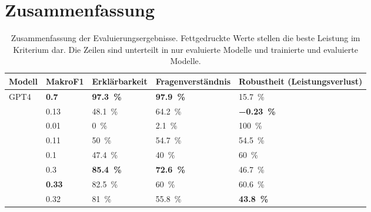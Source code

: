 \section{Zusammenfassung}\label{sec:results:summary}

\begin{table}
    \centering
    \begin{adjustbox}{width=\textwidth,center}
        \begin{tabular}{lllll}
            \toprule
            \textbf{Modell} & \textbf{MakroF1}                   & \textbf{Erklärbarkeit}                      & \textbf{Fragenverständnis}                  & \textbf{Robustheit (Leistungsverlust)}       \\
            \midrule
            GPT4            & \textbf{\num[detect-weight]{0.7}}  & \textbf{\SI[detect-weight]{97.3}{\percent}} & \textbf{\SI[detect-weight]{97.9}{\percent}} & \SI{15.7}{\percent}                          \\
            \lo{}           & \num{0.13}                         & \SI{48.1}{\percent}                         & \SI{64.2}{\percent}                         & \textbf{\SI[detect-weight]{-0.23}{\percent}} \\
            \midrule
            \liv{}          & \num{0.01}                         & \SI{0}{\percent}                            & \SI{2.1}{\percent}                          & \SI{100}{\percent}                           \\
            \lia{}          & \num{0.11}                         & \SI{50}{\percent}                           & \SI{54.7}{\percent}                         & \SI{54.5}{\percent}                          \\
            \lev{}          & \num{0.1}                          & \SI{47.4}{\percent}                         & \SI{40}{\percent}                           & \SI{60}{\percent}                            \\
            \lea{}          & \num{0.3}                          & \textbf{\SI[detect-weight]{85.4}{\percent}} & \textbf{\SI[detect-weight]{72.6}{\percent}} & \SI{46.7}{\percent}                          \\
            \lsa{}          & \textbf{\num[detect-weight]{0.33}} & \SI{82.5}{\percent}                         & \SI{60}{\percent}                          & \SI{60.6}{\percent}                          \\
            \lioa{}         & \num{0.32}                         & \SI{81}{\percent}                           & \SI{55.8}{\percent}                         & \textbf{\SI[detect-weight]{43.8}{\percent}}  \\
            \bottomrule
        \end{tabular}
    \end{adjustbox}
        \caption[Zusammenfassung der Evaluierungsergebnisse]{Zusammenfassung der Evaluierungsergebnisse. Fettgedruckte Werte stellen die beste Leistung im Kriterium dar. Die Zeilen sind unterteilt in nur evaluierte Modelle und trainierte und evaluierte Modelle. }\label{tab:results:summary}
    \end{table}
    
